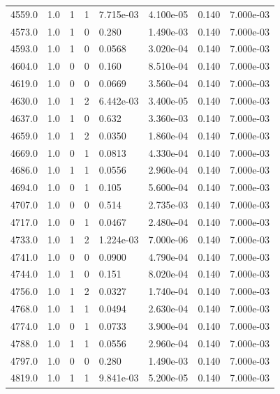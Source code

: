 \documentclass[preview]{standalone}
\begin{document}
{{{{{{{{{\begin{tabular}{L{1.2cm}C{1.2cm} C{0.3cm}C{0.5cm} C{1.4cm}C{1.4cm} C{1.4cm}C{1.4cm}}
  4559.0  &   1.0  & 1     &  1 &  7.715e-03  & 4.100e-05  & 0.140 &  7.000e-03   \\ 
  4573.0  &   1.0  & 1     &  0 &  0.280  & 1.490e-03  & 0.140 &  7.000e-03   \\ 
  4593.0  &   1.0  & 1     &  0 &  0.0568  & 3.020e-04  & 0.140 &  7.000e-03   \\ 
  4604.0  &   1.0  & 0     &  0 &  0.160  & 8.510e-04  & 0.140 &  7.000e-03   \\ 
  4619.0  &   1.0  & 0     &  0 &  0.0669  & 3.560e-04  & 0.140 &  7.000e-03   \\ 
  4630.0  &   1.0  & 1     &  2 &  6.442e-03  & 3.400e-05  & 0.140 &  7.000e-03   \\ 
  4637.0  &   1.0  & 1     &  0 &  0.632  & 3.360e-03  & 0.140 &  7.000e-03   \\ 
  4659.0  &   1.0  & 1     &  2 &  0.0350  & 1.860e-04  & 0.140 &  7.000e-03   \\ 
  4669.0  &   1.0  & 0     &  1 &  0.0813  & 4.330e-04  & 0.140 &  7.000e-03   \\ 
  4686.0  &   1.0  & 1     &  1 &  0.0556  & 2.960e-04  & 0.140 &  7.000e-03   \\ 
  4694.0  &   1.0  & 0     &  1 &  0.105  & 5.600e-04  & 0.140 &  7.000e-03   \\ 
  4707.0  &   1.0  & 0     &  0 &  0.514  & 2.735e-03  & 0.140 &  7.000e-03   \\ 
  4717.0  &   1.0  & 0     &  1 &  0.0467  & 2.480e-04  & 0.140 &  7.000e-03   \\ 
  4733.0  &   1.0  & 1     &  2 &  1.224e-03  & 7.000e-06  & 0.140 &  7.000e-03   \\ 
  4741.0  &   1.0  & 0     &  0 &  0.0900  & 4.790e-04  & 0.140 &  7.000e-03   \\ 
  4744.0  &   1.0  & 1     &  0 &  0.151  & 8.020e-04  & 0.140 &  7.000e-03   \\ 
  4756.0  &   1.0  & 1     &  2 &  0.0327  & 1.740e-04  & 0.140 &  7.000e-03   \\ 
  4768.0  &   1.0  & 1     &  1 &  0.0494  & 2.630e-04  & 0.140 &  7.000e-03   \\ 
  4774.0  &   1.0  & 0     &  1 &  0.0733  & 3.900e-04  & 0.140 &  7.000e-03   \\ 
  4788.0  &   1.0  & 1     &  1 &  0.0556  & 2.960e-04  & 0.140 &  7.000e-03   \\ 
  4797.0  &   1.0  & 0     &  0 &  0.280  & 1.490e-03  & 0.140 &  7.000e-03   \\ 
  4819.0  &   1.0  & 1     &  1 &  9.841e-03  & 5.200e-05  & 0.140 &  7.000e-03   \\ 

\end{tabular}}}}}}}}}}
\end{document}
